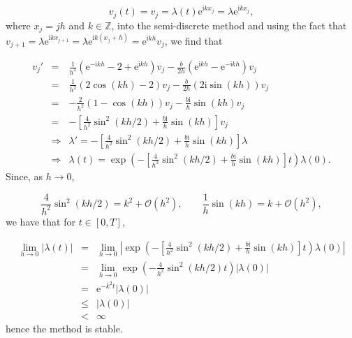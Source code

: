 \documentclass[12pt,a4paper]{article}
\begin{document}
\[
v_j(t) = v_j = \lambda(t)\mathrm{e}^{{\mathrm{i}}kx_j} = \lambda \mathrm{e}^{{\mathrm{i}}kx_j},
\]
where $x_j = jh$ and $k \in \mathbb{Z}$, into the semi-discrete method and using the fact that $v_{j+1} = \lambda \mathrm{e}^{{\mathrm{i}}kx_{j+1}} = \lambda \mathrm{e}^{{\mathrm{i}}k(x_{j}+h)} = \mathrm{e}^{{\mathrm{i}}kh}v_j$, we find that


\begin{eqnarray*}
v_j' &=& \frac{1}{h^2}\left(\mathrm{e}^{{-\mathrm{i}}kh} - 2 + \mathrm{e}^{{\mathrm{i}}kh}   \right)v_j - \frac{b}{2h}\left(\mathrm{e}^{{\mathrm{i}}kh}  - \mathrm{e}^{-{\mathrm{i}}kh}   \right)v_j \\
&=& \frac{1}{h^2}\left(2\cos(kh) - 2   \right)v_j - \frac{b}{2h}\left( 2\mathrm{i}\sin(kh)   \right)v_j \\
&=& -\frac{2}{h^2}\left(1 - \cos(kh)   \right)v_j - \frac{b\mathrm{i}}{h} \sin(kh)  v_j \\
&=& -\left[\frac{4}{h^2}\sin^2(kh/2) + \frac{b\mathrm{i}}{h} \sin(kh)\right]  v_j \\
& \Longrightarrow & \lambda' = -\left[\frac{4}{h^2}\sin^2(kh/2) + \frac{b\mathrm{i}}{h} \sin(kh)\right] \lambda \\
& \Longrightarrow & \lambda(t) = \exp\left( -\left[\frac{4}{h^2}\sin^2(kh/2) + \frac{b\mathrm{i}}{h} \sin(kh)\right] t  \right)\lambda(0).
\end{eqnarray*}
Since, as $h \to 0$,


\begin{equation*}
\frac{4}{h^2}\sin^2(kh/2) = k^2 + \mathcal{O}\left(h^2\right), \qquad \frac{1}{h} \sin(kh) = k + \mathcal{O}\left(h^2\right),
\end{equation*}
we have that for $t \in [0, T]$,


\begin{eqnarray*}
\lim_{h \to 0}\left\vert  \lambda(t)  \right\vert &=& \lim_{h \to 0}\left\vert  \exp\left( -\left[\frac{4}{h^2}\sin^2(kh/2) + \frac{b\mathrm{i}}{h} \sin(kh)\right] t  \right)\lambda(0)  \right\vert \\
&=& \lim_{h \to 0}  \exp\left( -\frac{4}{h^2}\sin^2(kh/2) t  \right)\left\vert\lambda(0)  \right\vert \\
&=& \mathrm{e}^{-k^2t}\left\vert\lambda(0)  \right\vert\\
& \leq & \left\vert\lambda(0)  \right\vert \\
& < & \infty
\end{eqnarray*}
hence the method is stable.
\end{document}
